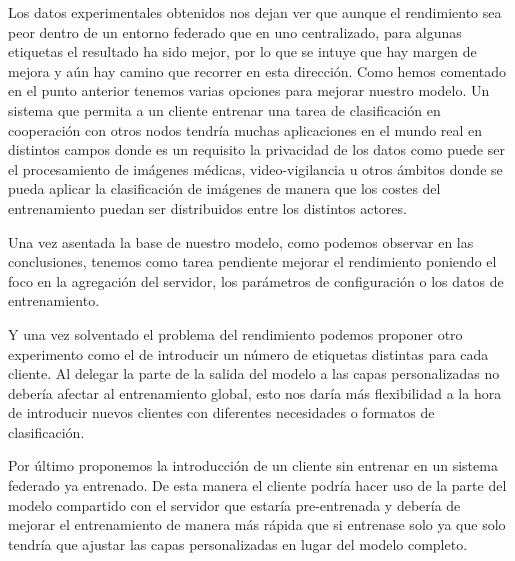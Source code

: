 Los datos experimentales obtenidos nos dejan ver que aunque el rendimiento sea peor dentro de un entorno federado que en uno centralizado, para algunas etiquetas el resultado ha sido mejor, por lo que se intuye que hay margen de mejora y aún hay camino que recorrer en esta dirección. Como hemos comentado en el punto anterior tenemos varias opciones para mejorar nuestro modelo. Un sistema que permita a un cliente entrenar una tarea de clasificación en cooperación con otros nodos tendría muchas aplicaciones en el mundo real en distintos campos donde es un requisito la privacidad de los datos como puede ser el procesamiento de imágenes médicas, video-vigilancia u otros ámbitos donde se pueda aplicar la clasificación de imágenes de manera que los costes del entrenamiento puedan ser distribuidos entre los distintos actores.

Una vez asentada la base de nuestro modelo, como podemos observar en las conclusiones, tenemos como tarea pendiente mejorar el rendimiento poniendo el foco en la agregación del servidor, los parámetros de configuración o los datos de entrenamiento. 

Y una vez solventado el problema del rendimiento podemos proponer otro experimento como el de introducir un número de etiquetas distintas para cada cliente. Al delegar la parte de la salida del modelo a las capas personalizadas no debería afectar al entrenamiento global, esto nos daría más flexibilidad a la hora de introducir nuevos clientes con diferentes necesidades o formatos de clasificación.

Por último proponemos la introducción de un cliente sin entrenar en un sistema federado ya entrenado. De esta manera el cliente podría hacer uso de la parte del modelo compartido con el servidor que estaría pre-entrenada y debería de mejorar el entrenamiento de manera más rápida que si entrenase solo ya que solo tendría que ajustar las capas personalizadas en lugar del modelo completo.